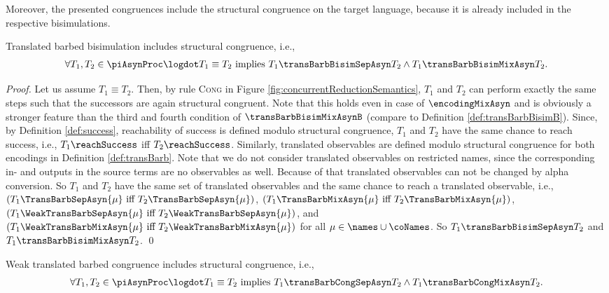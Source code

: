 \documentclass[]{llncs}
\begin{document}
Moreover, the presented congruences include the structural congruence on the target language, because it is already included in the respective bisimulations.

\begin{lemma} \label{lem:transBarbBisimIncludesSC}
	Translated barbed bisimulation includes structural congruence, i.e.,
	\begin{align*}
		\forall T_1, T_2 \in \piAsynProc \logdot T_1 \equiv T_2 \text{ implies } T_1 \transBarbBisimSepAsyn T_2 \wedge T_1 \transBarbBisimMixAsyn T_2.
	\end{align*}
\end{lemma}

\begin{proof}
	Let us assume $ T_1 \equiv T_2 $. Then, by rule \textsc{Cong} in Figure \ref{fig:concurrentReductionSemantics}, $ T_1 $ and $ T_2 $ can perform exactly the same steps such that the successors are again structural congruent. Note that this holds even in case of $ \encodingMixAsyn $ and is obviously a stronger feature than the third and fourth condition of $ \transBarbBisimMixAsynB $ (compare to Definition \ref{def:transBarbBisimB}). Since, by Definition \ref{def:success}, reachability of success is defined modulo structural congruence, $ T_1 $ and $ T_2 $ have the same chance to reach success, i.e., $ T_1 \reachSuccess $ iff $ T_2 \reachSuccess $. Similarly, translated observables are defined modulo structural congruence for both encodings in Definition \ref{def:transBarb}. Note that we do not consider translated observables on restricted names, since the corresponding in- and outputs in the source terms are no observables as well. Because of that translated observables can not be changed by alpha conversion. So $ T_1 $ and $ T_2 $ have the same set of translated observables and the same chance to reach a translated observable, i.e., $ \left( T_1\TransBarbSepAsyn{\mu} \text{ iff } T_2\TransBarbSepAsyn{\mu} \right) $, $ \left( T_1\TransBarbMixAsyn{\mu} \text{ iff } T_2\TransBarbMixAsyn{\mu} \right) $, $ \left( T_1\WeakTransBarbSepAsyn{\mu} \text{ iff } T_2\WeakTransBarbSepAsyn{\mu} \right) $, and $ \left( T_1\WeakTransBarbMixAsyn{\mu} \text{ iff } T_2\WeakTransBarbMixAsyn{\mu} \right) $ for all $ \mu \in \names \cup \coNames $. So $ T_1 \transBarbBisimSepAsyn T_2 $ and $ T_1 \transBarbBisimMixAsyn T_2 $.
	\qed
\end{proof}

\begin{lemma} \label{lem:transBarbCongIncludesSC}
	Weak translated barbed congruence includes structural congruence, i.e.,
	\begin{align*}
		\forall T_1, T_2 \in \piAsynProc \logdot T_1 \equiv T_2 \text{ implies } T_1 \transBarbCongSepAsyn T_2 \wedge T_1 \transBarbCongMixAsyn T_2.
	\end{align*}
\end{lemma}
\end{document}
